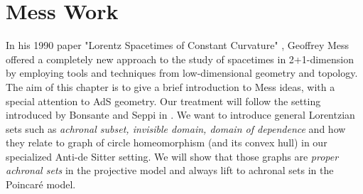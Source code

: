 \chapter{Mess Work}

In his 1990 paper "Lorentz Spacetimes of Constant Curvature" \cite{Mess}, Geoffrey Mess offered a completely new approach to the study of spacetimes in 2+1-dimension by employing tools and techniques from low-dimensional geometry and topology. The aim of this chapter is to give a brief introduction to Mess ideas, with a special attention to AdS geometry. Our treatment will follow the setting introduced by Bonsante and Seppi in \cite{bonsanteseppi}. We want to introduce general Lorentzian sets such as \textit{achronal subset, invisible domain, domain of dependence} and how they relate to graph of circle homeomorphism (and its convex hull) in our specialized Anti-de Sitter setting. We will show that those graphs are \textit{proper achronal sets} in the projective model and always lift to achronal sets in the Poincaré model.

